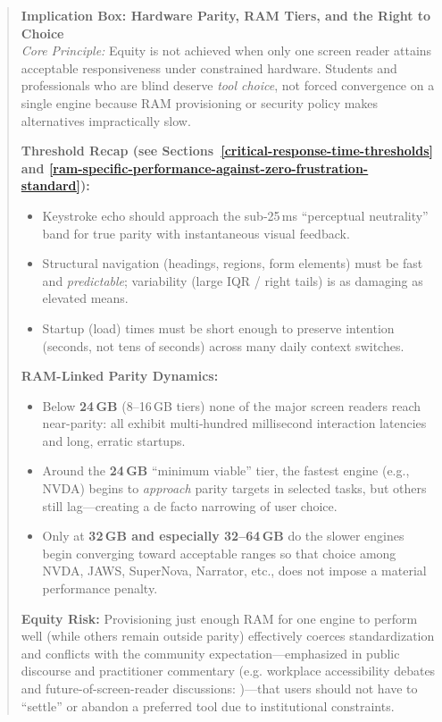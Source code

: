 \begin{quote}
	\textbf{Implication Box: Hardware Parity, RAM Tiers, and the Right to Choice}\\[2pt]
	\textit{Core Principle:} Equity is not achieved when only one screen reader attains acceptable responsiveness under constrained hardware. Students and professionals who are blind deserve \emph{tool choice}, not forced convergence on a single engine because RAM provisioning or security policy makes alternatives impractically slow.\par
	\textbf{Threshold Recap (see Sections~\ref{critical-response-time-thresholds} and \ref{ram-specific-performance-against-zero-frustration-standard}):}
	\begin{itemize}
		\item Keystroke echo should approach the sub‑25\,ms “perceptual neutrality” band for true parity with instantaneous visual feedback.
		\item Structural navigation (headings, regions, form elements) must be fast and \emph{predictable}; variability (large IQR / right tails) is as damaging as elevated means.
		\item Startup (load) times must be short enough to preserve intention (seconds, not tens of seconds) across many daily context switches.
	\end{itemize}
	\textbf{RAM-Linked Parity Dynamics:}
	\begin{itemize}
		\item Below \textbf{24\,GB} (8–16\,GB tiers) none of the major screen readers reach near-parity: all exhibit multi‑hundred millisecond interaction latencies and long, erratic startups.
		\item Around the \textbf{24\,GB} “minimum viable” tier, the fastest engine (e.g., NVDA) begins to \emph{approach} parity targets in selected tasks, but others still lag—creating a de facto narrowing of user choice.
		\item Only at \textbf{32\,GB and especially 32–64\,GB} do the slower engines begin converging toward acceptable ranges so that choice among NVDA, JAWS, SuperNova, Narrator, etc., does not impose a material performance penalty.
	\end{itemize}
	\textbf{Equity Risk:} Provisioning just enough RAM for one engine to perform well (while others remain outside parity) effectively coerces standardization and conflicts with the community expectation—emphasized in public discourse and practitioner commentary (e.g. workplace accessibility debates and future-of-screen-reader discussions: \supercite{doubletap2023studio,doubletap2023workplace})—that users should not have to “settle” or abandon a preferred tool due to institutional constraints.\par

\end{quote}
